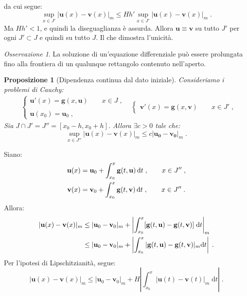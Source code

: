 \documentclass[a4paper,12pt]{report}
\theoremstyle{plain}
\newtheorem{prop}{Proposizione}[section]
\theoremstyle{definition}
\theoremstyle{remark}
\newtheorem{oss}{Osservazione}[section]
\newcommand{\diff}[1]{\mathrm{d}#1}
\numberwithin{equation}{section}
\begin{document}
da cui segue:
\begin{equation}
\sup_{x \in J'} |\mathbf{u}(x)-\mathbf{v}(x)|_m \le Hh' \sup_{x \in J'} |\mathbf{u}(x)-\mathbf{v}(x)|_m\;.
\end{equation}
Ma $Hh'<1$, e quindi la diseguaglianza è assurda. Allora $\mathbf{u} \equiv \mathbf{v}$ su tutto $J'$ per ogni $ J'\subset J$ e quindi
su tutto $J$. Il che dimostra l'unicità.
\endproof
\begin{oss} La soluzione di un'equazione differenziale può essere prolungata fino alla frontiera di un qualunque rettangolo contenuto nell'aperto.
\end{oss}
\begin{prop}[Dipendenza continua dal dato iniziale] Consideriamo i problemi di Cauchy:
\begin{align}
&\begin{cases}
\mathbf{u}'(x)=\mathbf{g}(x,\mathbf{u})\qquad x\in J\;, \\
\\
\mathbf{u}(x_0)=\mathbf{u}_0\;,
\end{cases}
&\begin{cases}
\mathbf{v}'(x)=\mathbf{g}(x,\mathbf{v})\qquad x\in J'\;,
\end{cases}
\end{align}
Sia $J \cap J'=J''=[x_0-h,x_0+h]$. Allora $\exists c>0$ tale che:
\begin{equation}
\sup_{x \in J''} |\mathbf{u}(x)-\mathbf{v}(x)|_m \le c|\mathbf{u_0}-\mathbf{v_0}|_m\;.
\end{equation}
\end{prop}
\proof Siano:
\begin{align}
\mathbf{u}(x) &= \mathbf{u}_0+\int_{x_0}^x\mathbf{g}(t,\mathbf{u})\,\diff{t}\;,\qquad x\in J''\;, \notag \\
\mathbf{v}(x)&= \mathbf{v}_0+\int_{x_0}^x\mathbf{g}(t,\mathbf{v})\,\diff{t}\;,\qquad x\in J''\;.
\end{align}
Allora:
\begin{align}
|\mathbf{u}(x)-\mathbf{v}(x)|_m &\le |\mathbf{u}_0-\mathbf{v}_0|_m+\left|\int_{x_0}^x[\mathbf{g}(t,\mathbf{u})-\mathbf{g}(t,\mathbf{v})]\;\diff{t}\right|_m \notag \\
&\le |\mathbf{u}_0-\mathbf{v}_0|_m+\left|\int_{x_0}^x |\mathbf{g}(t,\mathbf{u})-\mathbf{g}(t,\mathbf{v})|_m\diff{t}\right|\;.
\end{align}
Per l'ipotesi di Lipschitzianità, segue:
\begin{equation}
|\mathbf{u}(x)-\mathbf{v}(x)|_m \le |\mathbf{u}_0-\mathbf{v}_0|_m + H\left|\int_{x_0}^x |\mathbf{u}(t)-\mathbf{v}(t)|_m\;\diff{t}\right|\;.
\end{equation}
\end{document}

